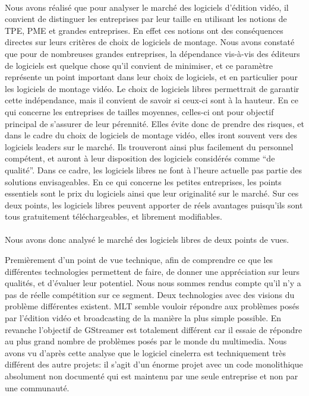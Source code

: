 \paragraph{}

Nous avons réalisé que pour analyser le marché des logiciels
d'édition vidéo, il convient de distinguer les entreprises par leur
taille en utilisant les notions de TPE, PME et grandes entreprises. En
effet ces notions ont des conséquences directes sur leurs critères
de choix de logiciels de montage.  Nous avons constaté que pour de
nombreuses  grandes entreprises, la dépendance vis-à-vis des éditeurs
de logiciels est quelque chose qu'il convient de minimiser, et ce
paramètre représente un point important dans leur choix de logiciels,
et en particulier pour les logiciels de montage vidéo. Le choix de
logiciels libres permettrait de garantir cette indépendance, mais il
convient de savoir si ceux-ci sont à la hauteur. En ce qui concerne les
entreprises de tailles moyennes, celles-ci ont pour objectif principal de
s'assurer de leur pérennité. Elles évite donc de prendre des risques,
et dans le cadre du choix de logiciels de montage vidéo, elles iront
souvent vers des logiciels leaders sur le marché. Ils trouveront ainsi
plus facilement du personnel compétent, et auront à leur disposition
des logiciels considérés comme ``de qualité''. Dans ce cadre, les
logiciels libres ne font à l'heure actuelle pas partie des solutions
envisageables. En ce qui concerne les petites entreprises, les points
essentiels sont le prix du logiciels ainsi que leur originalité sur le
marché. Sur ces deux points, les logiciels libres peuvent apporter de
réels avantages puisqu'ils sont tous gratuitement téléchargeables,
et librement modifiables.


\paragraph{}

Nous avons donc analysé le marché des logiciels libres de deux points
de vues.

Premièrement d'un point de vue technique, afin de comprendre ce que les
différentes technologies permettent de faire, de donner une appréciation
sur leurs qualités, et d'évaluer leur potentiel. Nous nous sommes rendus
compte qu'il n'y a pas de réelle compétition sur ce segment. Deux
technologies avec des visions du problème différentes existent. MLT
semble vouloir répondre aux problèmes posés par l'édition vidéo
et broadcasting de la manière la plus simple possible. En revanche
l'objectif de GStreamer est totalement différent car il essaie de
répondre au plus grand nombre de problèmes posés par le monde
du multimedia. Nous avons vu d'après cette analyse que le logiciel
cinelerra est techniquement très différent des autre projets: il
s'agit d'un énorme projet avec un code monolithique
absolument non documenté qui est maintenu par une seule entreprise et
non par une communauté.

